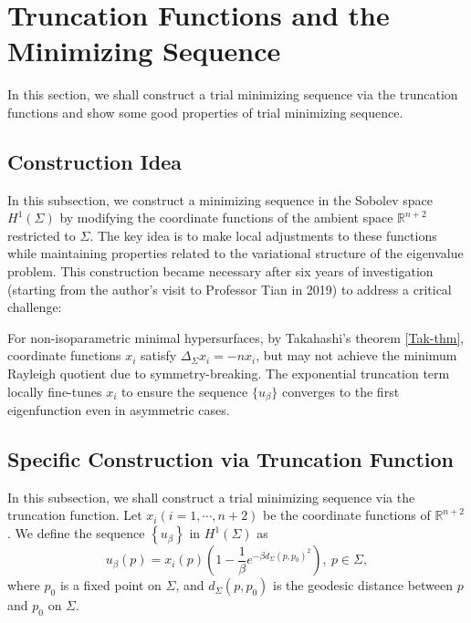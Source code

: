 \documentclass[a4, 12pt]{amsart}
\numberwithin{equation}{section} \numberwithin{equation}{section}
\begin{document}
\section{Truncation Functions and the Minimizing Sequence}\label{section: Truncation Functions}

In this section, we shall construct a trial minimizing sequence via the truncation functions and show some good properties of trial minimizing sequence.








\subsection{Construction Idea}

In this subsection, we construct a minimizing sequence in the Sobolev space $H^{1}(\Sigma)$ by modifying the coordinate functions of the ambient space $\mathbb{R}^{n+2}$ restricted to $\Sigma$. The key idea is to make local adjustments to these functions while maintaining properties related to the variational structure of the eigenvalue problem. This construction became necessary after six years of investigation (starting from the author's visit to Professor Tian in 2019) to address a critical challenge:

For non-isoparametric minimal hypersurfaces, by Takahashi's theorem \ref{Tak-thm}, coordinate functions $x_i$ satisfy $\Delta_\Sigma x_i = -n x_i$, but may not achieve the minimum Rayleigh quotient due to symmetry-breaking. The exponential truncation term locally fine-tunes $x_i$ to ensure the sequence $\{u_\beta\}$ converges to the first eigenfunction even in asymmetric cases.

\subsection{Specific Construction via Truncation Function}
In this subsection, we shall construct a trial minimizing sequence via the truncation function.
Let $x_{i}(i=1, \cdots, n+2)$ be the coordinate functions of $\mathbb{R}^{n+2}$. We define the sequence $\left\{u_{\beta}\right\}$ in $H^{1}(\Sigma)$ as
\begin{equation*}
u_{\beta}(p)=x_{i}(p)\left(1-\frac{1}{\beta} e^{-\beta d_{\Sigma}\left(p, p_{0}\right)^{2}}\right),~ p \in \Sigma,
\end{equation*}
where $p_{0}$ is a fixed point on $\Sigma$, and $d_{\Sigma}\left(p, p_{0}\right)$ is the geodesic distance between $p$ and $p_{0}$ on $\Sigma$.
\end{document}
